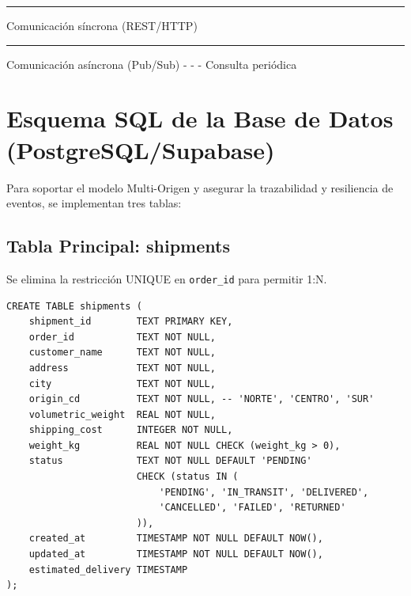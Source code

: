 \documentclass[11pt, a4paper]{article}
\begin{document}
\begin{center}
\end{center}

\vspace{0.5cm}
\begin{center}
{\footnotesize
  \textcolor{info}{\rule{0.6cm}{2pt}} Comunicación síncrona (REST/HTTP) \qquad
  \textcolor{success}{\rule{0.6cm}{2pt}} Comunicación asíncrona (Pub/Sub) \qquad
  \textcolor{info}{- - -} Consulta periódica
}
\end{center}


\section{Esquema SQL de la Base de Datos (PostgreSQL/Supabase)}

Para soportar el modelo Multi-Origen y asegurar la trazabilidad y resiliencia de eventos, se implementan tres tablas:

\subsection{Tabla Principal: shipments}
Se elimina la restricción UNIQUE en \texttt{order\_id} para permitir 1:N.

\begin{lstlisting}
CREATE TABLE shipments (
    shipment_id        TEXT PRIMARY KEY,
    order_id           TEXT NOT NULL,
    customer_name      TEXT NOT NULL,
    address            TEXT NOT NULL,
    city               TEXT NOT NULL,
    origin_cd          TEXT NOT NULL, -- 'NORTE', 'CENTRO', 'SUR'
    volumetric_weight  REAL NOT NULL,
    shipping_cost      INTEGER NOT NULL,
    weight_kg          REAL NOT NULL CHECK (weight_kg > 0),
    status             TEXT NOT NULL DEFAULT 'PENDING'
                       CHECK (status IN (
                           'PENDING', 'IN_TRANSIT', 'DELIVERED',
                           'CANCELLED', 'FAILED', 'RETURNED'
                       )),
    created_at         TIMESTAMP NOT NULL DEFAULT NOW(),
    updated_at         TIMESTAMP NOT NULL DEFAULT NOW(),
    estimated_delivery TIMESTAMP
);
\end{lstlisting}
\end{document}
